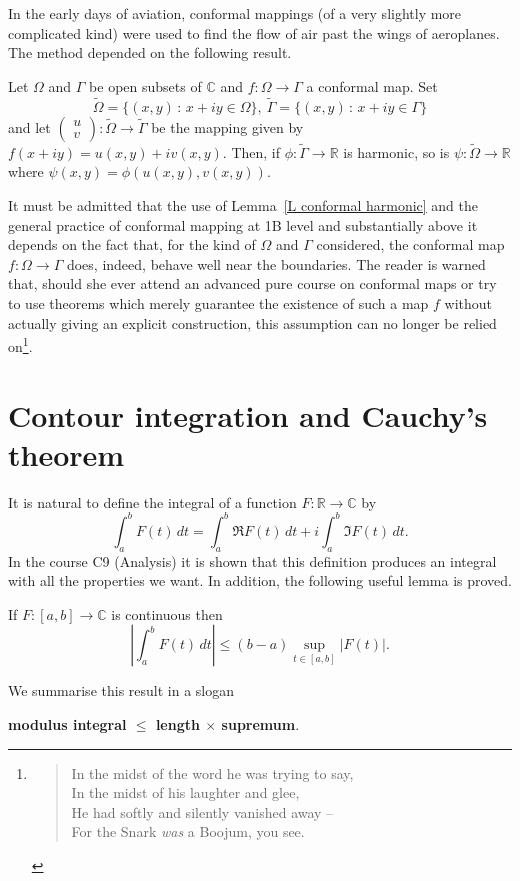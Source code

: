 In the early days of aviation, conformal mappings
(of a very slightly more complicated kind) were
used to find the flow of air past the wings of aeroplanes.
The method depended on the following result.
\begin{lemma}\label{L conformal harmonic}
Let $\Omega$ and $\Gamma$ be open subsets 
of ${\mathbb C}$ and $f:\Omega\rightarrow\Gamma$
a conformal map. Set
\[\tilde{\Omega}=\{(x,y)\,:\,x+iy\in\Omega\},
\ \tilde{\Gamma}=\{(x,y)\,:\,x+iy\in\Gamma\}\]
and let
${\displaystyle
\left(
\begin{matrix}u\\v\end{matrix}
\right)
:\tilde{\Omega}\rightarrow\tilde{\Gamma}}$
be the mapping given by $f(x+iy)=u(x,y)+iv(x,y)$.
Then, if $\phi:\tilde{\Gamma}\rightarrow{\mathbb R}$
is harmonic, so is $\psi:\tilde{\Omega}\rightarrow{\mathbb R}$
where $\psi(x,y)=\phi(u(x,y),v(x,y))$.
\end{lemma}
It must be admitted that the use of Lemma~\ref{L conformal harmonic}
and the general practice of conformal mapping at
1B level and substantially above it depends on the
fact that, for the kind of $\Omega$ and $\Gamma$ considered,
the conformal map $f:\Omega\rightarrow\Gamma$
does, indeed,
behave well near the boundaries. The reader is warned
that, should she ever attend an advanced pure course
on conformal maps or try to use theorems which merely
guarantee the existence of such a map $f$ without
actually giving an explicit construction, this
assumption can no longer be relied
on\footnote{\begin{verse}
In the midst of the word he was trying to say,\\
In the midst of his laughter and glee,\\
He had softly and silently vanished away --\\
For the Snark \emph{was} a Boojum, you see.
\end{verse}}.
\section{Contour integration and Cauchy's theorem}
It is natural to define the integral of a function
$F:{\mathbb R}\rightarrow{\mathbb C}$ by
\[\int_{a}^{b}F(t)\,dt=\int_{a}^{b}\Re F(t)\,dt
+i\int_{a}^{b}\Im F(t)\,dt.\]
In the course C9 (Analysis) it is shown that
this definition produces an integral with all the
properties we want. In addition, the following useful
lemma is proved.
\begin{lemma}\label{L; bound integral}
If $F:[a,b]\rightarrow{\mathbb C}$
is continuous then
\[\left|\int_{a}^{b}F(t)\,dt\right|
\leq (b-a)\sup_{t\in[a,b]}|F(t)|.\]
\end{lemma}
We summarise this result in a slogan
\begin{center}
{\bf modulus integral $\leq$ length $\times$ supremum}.
\end{center}

